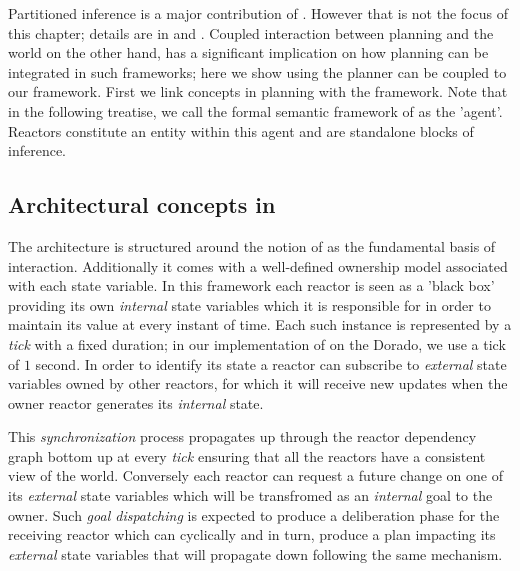 Partitioned inference is a major contribution of \rx. However that is
not the focus of this chapter; details are in \cite{py10} and
\cite{rajan12}. Coupled interaction between planning and the world on
the other hand, has a significant implication on how planning can be
integrated in such frameworks; here we show using the \eu planner can
be coupled to our framework. First we link concepts in \eu planning
with the \rx framework. Note that in the following treatise, we call
the formal semantic framework of \rx as the 'agent'. Reactors
constitute an entity within this agent and are standalone blocks of
inference.


\subsection{Architectural concepts in \rx}
\label{sec:arch:trex}

The \rx architecture is structured around the notion of  as the fundamental basis of interaction. Additionally it
comes with a well-defined ownership model associated with each state
variable. In this framework each reactor is seen as a 'black box'
providing its own {\em internal} state variables which it is
responsible for in order to maintain its value at every instant of
time. Each such instance is represented by a {\em tick} with a fixed
duration; in our implementation of \rx on the Dorado, we use a tick of
$1$ second. In order to identify its state a reactor can subscribe to
{\em external} state variables owned by other reactors, for which it
will receive new updates when the owner reactor generates its {\em
  internal} state.

This {\em synchronization} process propagates up through the reactor
dependency graph bottom up at every {\em tick} ensuring that all the
reactors have a consistent view of the world. Conversely each reactor
can request a future change on one of its {\em external} state
variables which will be transfromed as an {\em internal} goal to the
owner. Such \emph{goal dispatching} is expected to produce a
deliberation phase for the receiving reactor which can cyclically and
in turn, produce a plan impacting its {\em external} state variables
that will propagate down following the same mechanism.

